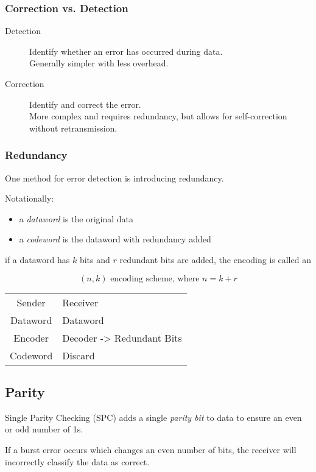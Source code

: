 \documentclass{article}
\begin{document}
\subsubsection*{Correction vs. Detection}
\begin{description}
    \item[Detection] Identify whether an error has occurred during data. \\
          Generally simpler with less overhead.
    \item[Correction] Identify and correct the error. \\
          More complex and requires redundancy, but allows for self-correction without retransmission.
\end{description}

\subsubsection*{Redundancy}
One method for error detection is introducing redundancy.

Notationally:
\begin{itemize}
    \item a \emph{dataword} is the original data
    \item a \emph{codeword} is the dataword with redundancy added
\end{itemize}

if a dataword has $k$ bits and $r$ redundant bits are added, the encoding is called an

\begin{equation*}
    (n, k) \text{ encoding scheme, where } n = k + r
\end{equation*}

\begin{tabular}{cl}
    Sender   & Receiver                  \\
    Dataword & Dataword                  \\
    Encoder  & Decoder -> Redundant Bits \\
    Codeword & Discard
\end{tabular}

\subsection*{Parity}
Single Parity Checking (SPC) adds a single \emph{parity bit} to data to ensure an even or odd number of 1s.

If a burst error occurs which changes an even number of bits, the receiver will
incorrectly classify the data as correct.
\end{document}
